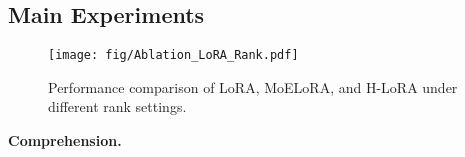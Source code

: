\subsection{Main Experiments}

\begin{figure}[h]
    \centering
    \texttt{[image: fig/Ablation\_LoRA\_Rank.pdf]}
    \caption{Performance comparison of LoRA, MoELoRA, and H-LoRA under different rank settings.}
    \label{fig:6}
    \vskip -0.1in
\end{figure}

\noindent \textbf{Comprehension.}  
